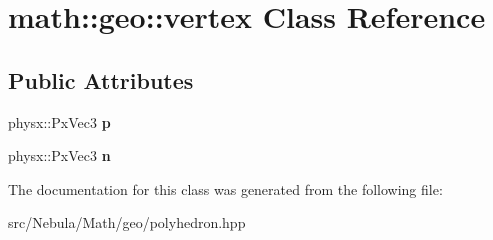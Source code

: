 \hypertarget{classmath_1_1geo_1_1vertex}{\section{math\-:\-:geo\-:\-:vertex \-Class \-Reference}
\label{classmath_1_1geo_1_1vertex}
}
\subsection*{\-Public \-Attributes}
\begin{DoxyCompactItemize}
\item 
\hypertarget{classmath_1_1geo_1_1vertex_ac68d02726094408a170228135a68a1ef}{physx\-::\-Px\-Vec3 {\bfseries p}}\label{classmath_1_1geo_1_1vertex_ac68d02726094408a170228135a68a1ef}

\item 
\hypertarget{classmath_1_1geo_1_1vertex_af0bd124b0e264a44aa5ee617e423c95d}{physx\-::\-Px\-Vec3 {\bfseries n}}\label{classmath_1_1geo_1_1vertex_af0bd124b0e264a44aa5ee617e423c95d}

\end{DoxyCompactItemize}


\-The documentation for this class was generated from the following file\-:\begin{DoxyCompactItemize}
\item 
src/\-Nebula/\-Math/geo/polyhedron.\-hpp\end{DoxyCompactItemize}
